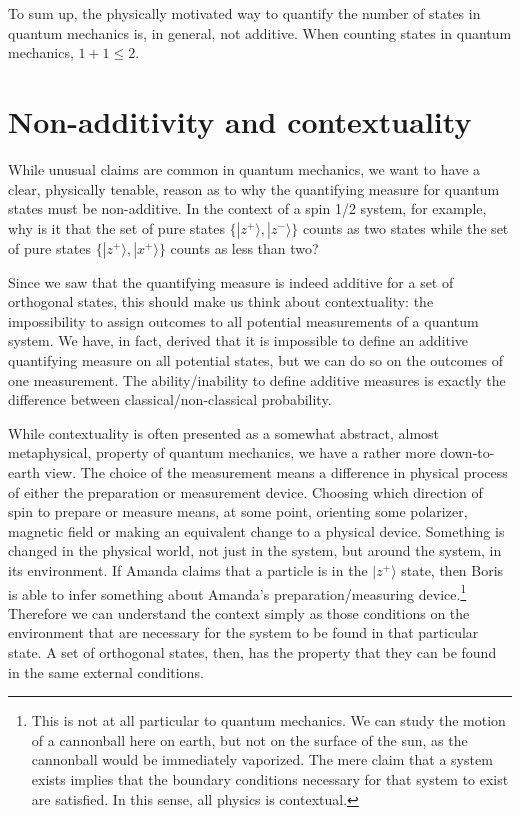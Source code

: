 \documentclass[entropy,article,submit,pdftex,moreauthors]{Definitions/mdpi}
\def\>{\rangle}
\begin{document}
To sum up, the physically motivated way to quantify the number of states in quantum mechanics is, in general, not additive. When counting states in quantum mechanics, $1+1 \leq 2$.

\section{Non-additivity and contextuality}

While unusual claims are common in quantum mechanics, we want to have a clear, physically tenable, reason as to why the quantifying measure for quantum states must be non-additive. In the context of a spin 1/2 system, for example, why is it that the set of pure states $\{ |z^+\>, |z^-\>\}$ counts as two states while the set of pure states $\{ |z^+\>, |x^+\> \}$ counts as less than two?

Since we saw that the quantifying measure is indeed additive for a set of orthogonal states, this should make us think about contextuality: the impossibility to assign outcomes to all potential measurements of a quantum system. We have, in fact, derived that it is impossible to define an additive quantifying measure on all potential states, but we can do so on the outcomes of one measurement. The ability/inability to define additive measures is exactly the difference between classical/non-classical probability.

While contextuality is often presented as a somewhat abstract, almost metaphysical, property of quantum mechanics, we have a rather more down-to-earth view. The choice of the measurement means a difference in physical process of either the preparation or measurement device. Choosing which direction of spin to prepare or measure means, at some point, orienting some polarizer, magnetic field or making an equivalent change to a physical device. Something is changed in the physical world, not just in the system, but around the system, in its environment. If Amanda claims that a particle is in the $|z^+\>$ state, then Boris is able to infer something about Amanda's preparation/measuring device.\footnote{This is not at all particular to quantum mechanics. We can study the motion of a cannonball here on earth, but not on the surface of the sun, as the cannonball would be immediately vaporized. The mere claim that a system exists implies that the boundary conditions necessary for that system to exist are satisfied. In this sense, all physics is contextual.} Therefore we can understand the context simply as those conditions on the environment that are necessary for the system to be found in that particular state. A set of orthogonal states, then, has the property that they can be found in the same external conditions.
\end{document}
